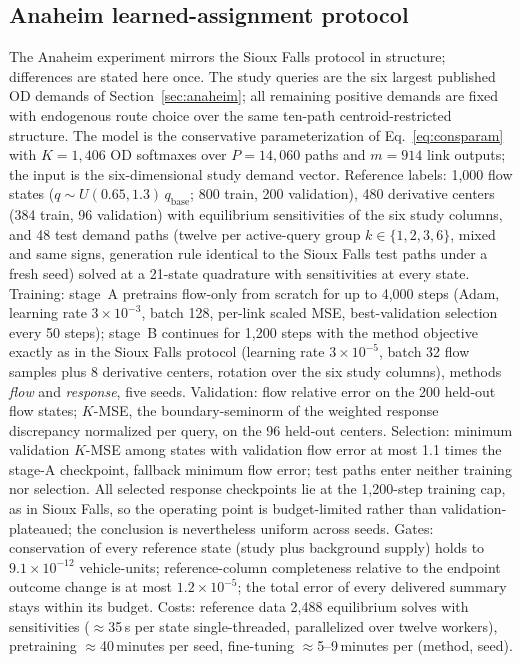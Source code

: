 \subsection{Anaheim learned-assignment protocol}\label{app:anaheimlearning}
The Anaheim experiment mirrors the Sioux Falls protocol in structure;
differences are stated here once. The study queries are the six largest
published OD demands of Section~\ref{sec:anaheim}; all remaining
positive demands are fixed with endogenous route choice over the same
ten-path centroid-restricted structure. The model is the conservative
parameterization of Eq.~\eqref{eq:consparam} with $K=1{,}406$ OD
softmaxes over $P=14{,}060$ paths and $m=914$ link outputs; the input
is the six-dimensional study demand vector. Reference labels: 1{,}000
flow states ($q\sim U(0.65,1.3)\,q_{\mathrm{base}}$; 800 train, 200
validation), 480 derivative centers (384 train, 96 validation) with
equilibrium sensitivities of the six study columns, and 48 test demand
paths (twelve per active-query group $k\in\{1,2,3,6\}$, mixed and same
signs, generation rule identical to the Sioux Falls test paths under a
fresh seed) solved at a 21-state quadrature with sensitivities at every
state. Training: stage~A pretrains flow-only from scratch for up to
4{,}000 steps (Adam, learning rate $3\times10^{-3}$, batch 128,
per-link scaled MSE, best-validation selection every 50 steps); stage~B
continues for 1{,}200 steps with the method objective exactly as in
the Sioux Falls protocol (learning rate $3\times10^{-5}$, batch 32
flow samples plus 8 derivative centers, rotation over the six study
columns), methods \emph{flow} and \emph{response}, five seeds.
Validation: flow relative error on the 200 held-out flow states;
$K$-MSE, the boundary-seminorm of the weighted response discrepancy
normalized per query, on the 96 held-out centers. Selection: minimum
validation $K$-MSE among states with validation flow error at most
1.1 times the stage-A checkpoint, fallback minimum flow error; test
paths enter neither training nor selection. All selected response
checkpoints lie at the 1{,}200-step training cap, as in Sioux Falls,
so the operating point is budget-limited rather than
validation-plateaued; the conclusion is nevertheless uniform across
seeds. Gates: conservation of every reference state (study plus
background supply) holds to $9.1\times10^{-12}$ vehicle-units;
reference-column completeness relative to the endpoint outcome change
is at most $1.2\times10^{-5}$; the total error of every delivered
summary stays within its budget. Costs: reference data 2{,}488
equilibrium solves with sensitivities ($\approx$35\,s per state
single-threaded, parallelized over twelve workers), pretraining
$\approx$40\,minutes per seed, fine-tuning $\approx$5--9\,minutes per
(method, seed).

